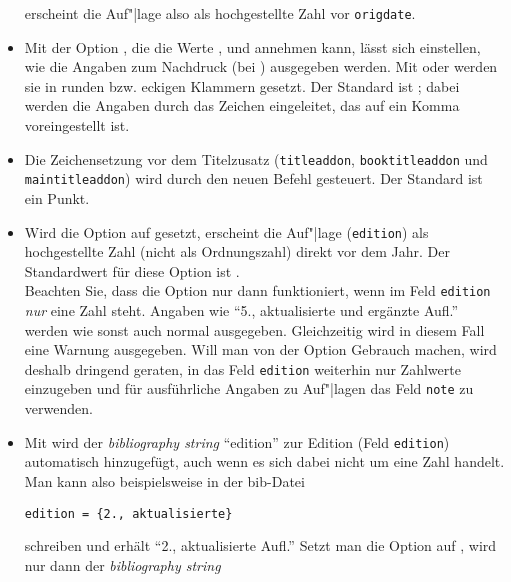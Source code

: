 \documentclass[ngerman]{scrartcl}
\begin{document}
\begin{itemize}
        erscheint die Auf"|lage also als hochgestellte Zahl vor 
        \texttt{origdate}.
  \item Mit
	      der Option , die die Werte ,
         und  annehmen kann, lässt sich einstellen,
        wie die Angaben zum Nachdruck (bei ) ausgegeben
        werden. Mit  oder  werden sie in runden 
        bzw. eckigen Klammern gesetzt. Der Standard ist ; dabei 
        werden die Angaben durch das Zeichen  
        eingeleitet, das auf ein Komma voreingestellt ist.
  \item Die Zeichensetzung vor dem Titelzusatz (\texttt{titleaddon},
        \texttt{booktitleaddon} und \texttt{maintitleaddon}) wird durch den 
        neuen Befehl  gesteuert. Der Standard ist ein 
        Punkt.
  \item Wird
	      die Option  auf  gesetzt, erscheint
        die Auf"|lage (\texttt{edition}) als hochgestellte Zahl (nicht als 
        Ordnungszahl) direkt vor dem Jahr. Der Standardwert für diese Option 
        ist .\\
        \achtung Beachten Sie, dass die Option  nur dann 
        funktioniert,
        wenn im Feld \texttt{edition} \emph{nur} eine Zahl steht. Angaben wie 
        \enquote{5., aktualisierte und ergänzte Aufl.} werden wie sonst auch
        normal ausgegeben. Gleichzeitig wird in diesem Fall eine Warnung 
        ausgegeben.
        Will man von der Option  Gebrauch machen, wird deshalb 
        dringend geraten, in das Feld \texttt{edition} weiterhin nur Zahlwerte 
        einzugeben und für ausführliche Angaben zu Auf"|lagen das Feld 
        \texttt{note} zu verwenden.
	\item Mit  wird
        der \emph{bibliography string} \enquote{edition} zur Edition (Feld
        \texttt{edition}) automatisch hinzugefügt, auch wenn es sich dabei 
        nicht um eine Zahl handelt. Man kann also beispielsweise in der bib-Datei
	      \begin{lstlisting}
edition = {2., aktualisierte}
	      \end{lstlisting}
        schreiben und erhält \enquote{2., aktualisierte Aufl.}
        Setzt man die Option auf , wird nur dann der \emph{bibliography string}

\end{itemize}
\end{document}
